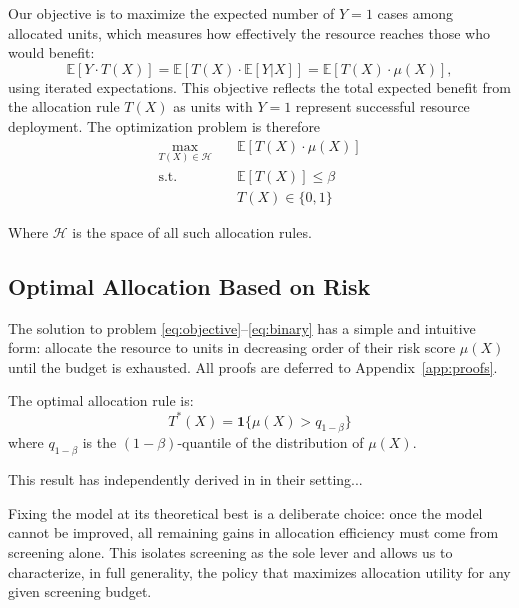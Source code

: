 Our objective is to maximize the expected number of $Y=1$ cases among allocated units, which measures how effectively the resource reaches those who would benefit:
\begin{equation}
  \mathbb{E}[Y \cdot T(X)] = \mathbb{E}[T(X) \cdot \mathbb{E}[Y|X]] = \mathbb{E}[T(X) \cdot \mu(X)],  
\end{equation}
using iterated expectations. This objective reflects the total expected benefit from the allocation rule $T(X)$ as units with $Y=1$ represent successful resource deployment. The optimization problem is therefore
\begin{align}
\max_{T(X) \in \mathcal{H}} &\quad \mathbb{E}[T(X) \cdot \mu(X)] \label{eq:objective}\\
\text{s.t.} &\quad \mathbb{E}[T(X)] \leq \beta \label{eq:budget}\\
&\quad T(X) \in \{0,1\} \label{eq:binary}
\end{align}

Where $\mathcal{H}$ is the space of all such allocation rules.



\subsection{Optimal Allocation Based on Risk}

The solution to problem \eqref{eq:objective}--\eqref{eq:binary} has a simple and intuitive form: allocate the resource to units in decreasing order of their risk score $\mu(X)$ until the budget is exhausted. All proofs are deferred to Appendix~\ref{app:proofs}.\\

\begin{theorem}
\label{thm:optimal_no_screening}
The optimal allocation rule is:
$$T^*(X) = \mathbf{1}\{\mu(X) > q_{1-\beta}\}$$
where $q_{1-\beta}$ is the $(1-\beta)$-quantile of the distribution of $\mu(X)$.
\end{theorem}


\begin{remark}
    This result has independently derived in \cite{fischer2025value} in their setting...
\end{remark}

\begin{remark}
    Fixing the model at its theoretical best is a deliberate choice: once the model cannot be improved, all remaining gains in allocation efficiency must come from screening alone. This isolates screening as the sole lever and allows us to characterize, in full generality, the policy that maximizes allocation utility for any given screening budget. 
\end{remark}


